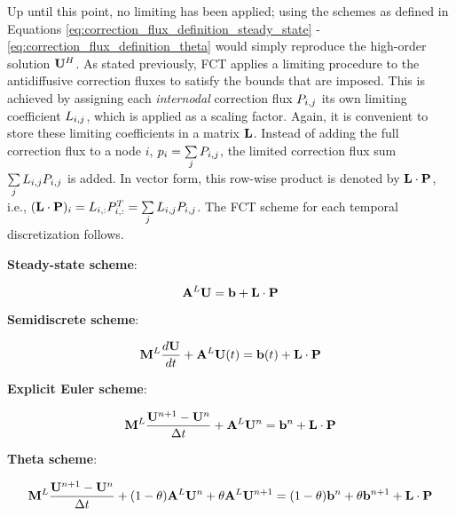 Up until this point, no limiting has been applied; using the schemes as defined
in Equations \eqref{eq:correction_flux_definition_steady_state}
- \eqref{eq:correction_flux_definition_theta} would simply reproduce the
high-order solution $\highordersolution$. As stated previously, FCT applies a
limiting procedure to the antidiffusive correction fluxes to satisfy the bounds
that are imposed. This is achieved by assigning each \emph{internodal}
correction flux $\MakeUppercase{\correctionfluxletter}\ij$ its own limiting
coefficient $L_{i,j}$, which is applied as a scaling factor. Again,
it is convenient to store these limiting coefficients in a matrix
$\mathbf{L}$. Instead of adding the full correction flux to a node $i$,
$\correctionfluxletter_i=\sumj\MakeUppercase{\correctionfluxletter}\ij$, the
limited correction flux sum
$\sumj\limiterletter\ij\MakeUppercase{\correctionfluxletter}\ij$ is added. In
vector form, this row-wise product is denoted by $\limitedfluxsum$, i.e.,
$(\limitedfluxsum)_i =
\limiterletter_{i,:}\MakeUppercase{\correctionfluxletter}_{i,:}^T =
\limitedfluxsumi$.
The FCT scheme for each temporal discretization follows.
\begin{center}{\textbf{Steady-state scheme}:}\end{center}
\begin{equation}\label{eq:fct_steady_state}
  \loworderssmatrix\solutionvector = \ssrhs + \limitedfluxsum
\end{equation}
\begin{center}{\textbf{Semidiscrete scheme}:}\end{center}
\begin{equation}\label{eq:fct_semidiscrete}
  \lumpedmassmatrix\ddt{\solutionvector}
  + \loworderssmatrix\solutionvector(\timevalue)
  = \ssrhs(\timevalue) + \limitedfluxsum
\end{equation}
\begin{center}{\textbf{Explicit Euler scheme}:}\end{center}
\begin{equation}\label{eq:fct_explicit_euler}
  \lumpedmassmatrix\frac{\solutionvector^{\timeindex+1}
    - \solutionvector^\timeindex}{\timestepsize}
  + \loworderssmatrix\solutionvector^\timeindex
  = \ssrhs^\timeindex + \limitedfluxsum
\end{equation}
\begin{center}{\textbf{Theta scheme}:}\end{center}
\begin{equation}\label{eq:fct_theta}
  \lumpedmassmatrix\frac{\solutionvector^{\timeindex+1}
    - \solutionvector^\timeindex}{\timestepsize}
  + (1-\theta)\loworderssmatrix\solutionvector^\timeindex
  + \theta\loworderssmatrix\solutionvector^{\timeindex+1}
  = (1-\theta)\ssrhs^\timeindex
  + \theta\ssrhs^{\timeindex+1} + \limitedfluxsum
\end{equation}
